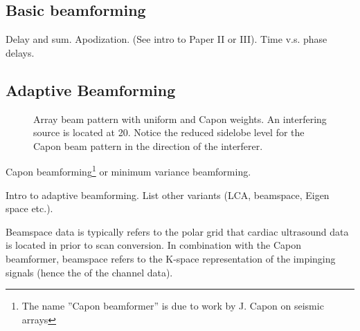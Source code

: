 \subsection{Basic beamforming}

Delay and sum. Apodization. (See intro to Paper II or III).
Time v.s. phase delays.

\subsection{Adaptive Beamforming}\label{sec:adaptbf}

\begin{figure}[t!]
\caption{Array beam pattern with uniform and Capon weights. An interfering source is located at 20\degree. Notice the reduced sidelobe level for the Capon beam pattern in the direction of the interferer.}
\end{figure}

Capon beamforming\footnote{The name ''Capon beamformer'' is due to work by J. Capon  on seismic arrays } or minimum variance beamforming.

Intro to adaptive beamforming. List other variants (LCA, beamspace, Eigen space etc.). 

Beamspace data is typically refers to the polar grid that cardiac ultrasound data is located in prior to scan conversion. In combination with the Capon beamformer, beamspace refers to the K-space representation of the impinging signals (hence the  of the channel data). 

